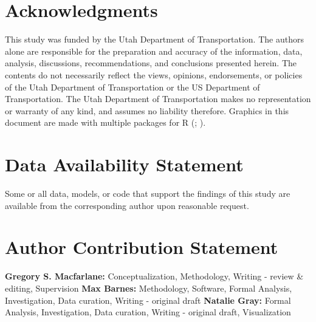 \documentclass[]{ascelike-new}
\begin{document}

\section*{Acknowledgments}\label{acknowledgments}


This study was funded by the Utah Department of Transportation. The
authors alone are responsible for the preparation and accuracy of the
information, data, analysis, discussions, recommendations, and
conclusions presented herein. The contents do not necessarily reflect
the views, opinions, endorsements, or policies of the Utah Department of
Transportation or the US Department of Transportation. The Utah
Department of Transportation makes no representation or warranty of any
kind, and assumes no liability therefore. Graphics in this document are
made with multiple packages for R
(;
).


\section*{Data Availability
Statement}\label{data-availability-statement}


Some or all data, models, or code that support the findings of this
study are available from the corresponding author upon reasonable
request.


\section*{Author Contribution
Statement}\label{author-contribution-statement}


\textbf{Gregory S. Macfarlane:} Conceptualization, Methodology, Writing
- review \& editing, Supervision \textbf{Max Barnes:} Methodology,
Software, Formal Analysis, Investigation, Data curation, Writing -
original draft \textbf{Natalie Gray:} Formal Analysis, Investigation,
Data curation, Writing - original draft, Visualization
\end{document}
